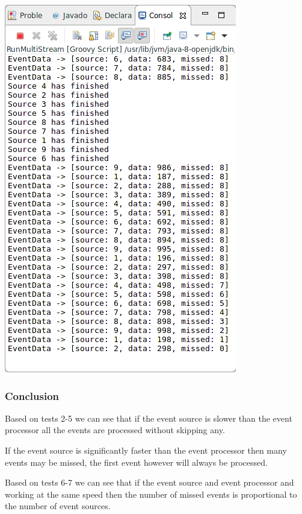 \includegraphics[width=\textwidth/2]{img/screenshots/9-2-7.png}

\subsubsection*{Conclusion}

Based on tests 2-5 we can see that if the event source is slower than the event processor all the events are processed without skipping any.

If the event source is significantly faster than the event processor then many events may be missed, the first event however will always be processed.

Based on tests 6-7 we can see that if the event source and event processor and working at the same speed then the number of missed events is proportional to the number of event sources.

